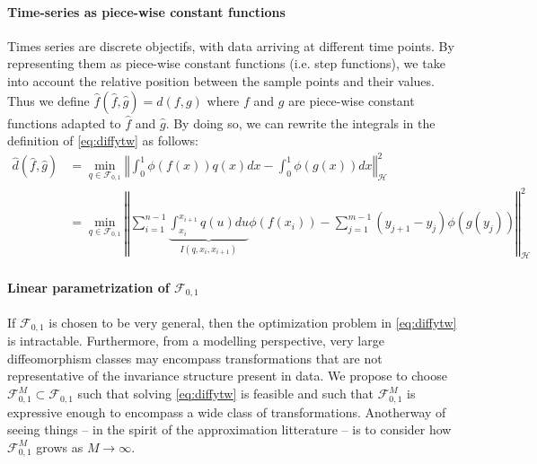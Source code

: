 \paragraph{Time-series as piece-wise constant functions} Times series are discrete objectifs, with data arriving at different time points. By representing them as piece-wise constant functions (i.e. step functions), we take into account the relative position between the sample points and their values. %
Thus we define $\hat f(\hat f, \hat g) =d(f, g)$ where $f$ and $g$ are piece-wise constant functions adapted to $\hat f$ and $\hat g$. By doing so, we can rewrite the integrals in the definition of \cref{eq:diffytw} as follows:
\begin{align}
    \hat d(\hat f, \hat g) &= \min_{q \in \mathcal F_{0,1}}\left\Vert \int_0^1 \phi(f(x))q(x)dx - \int_0^1\phi(g(x))dx\right\Vert^2_\mathcal H\label{eq:diffytw-step-1}\\
            &\label{eq:diffytw-step-2}= \min_{q\in\mathcal F_{0,1}} \left \Vert \sum_{i=1}^{n-1} \underbrace{\int_{x_i}^{x_{i+1}}q(u)du}_{I(q, x_i, x_{i+1})} \phi(f(x_i)) - \sum_{j=1}^{m-1} (y_{j+1} - y_j)\phi(g(y_j))\right\Vert_\mathcal H^2
\end{align}

\paragraph{Linear parametrization of $\mathcal F_{0,1}$} If $\mathcal F_{0,1}$ is chosen to be very general, then the optimization problem in \cref{eq:diffytw} is intractable. Furthermore, from a modelling perspective, very large diffeomorphism classes may encompass transformations that are not representative of the invariance structure present in data. We propose to choose $\mathcal F_{0,1}^M\subset \mathcal F_{0,1}$ such that solving \cref{eq:diffytw} is feasible and such that $\mathcal F_{0,1}^M$ is expressive enough to encompass a wide class of transformations. Anotherway of seeing things -- in the spirit of the approximation litterature -- is to consider how $\mathcal F_{0, 1}^M$ grows as $M \to \infty$.

